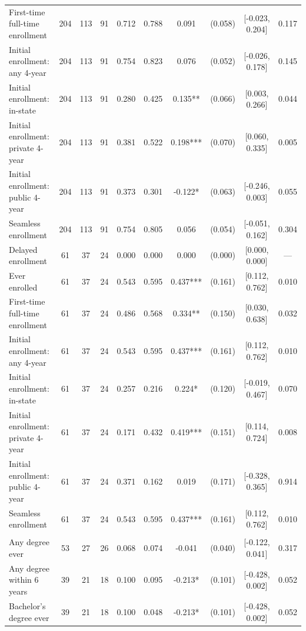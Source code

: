 \begin{table}[t]
\begin{tabular*}{\linewidth}{@{\extracolsep{\fill}}l|ccccccccc}
First-time full-time enrollment & 204 & 113 & 91 & 0.712 & 0.788 & 0.091 & (0.058) & [-0.023, 0.204] & 0.117 \\ 
Initial enrollment: any 4-year & 204 & 113 & 91 & 0.754 & 0.823 & 0.076 & (0.052) & [-0.026, 0.178] & 0.145 \\ 
Initial enrollment: in-state & 204 & 113 & 91 & 0.280 & 0.425 & 0.135** & (0.066) & [0.003, 0.266] & 0.044 \\ 
Initial enrollment: private 4-year & 204 & 113 & 91 & 0.381 & 0.522 & 0.198*** & (0.070) & [0.060, 0.335] & 0.005 \\ 
Initial enrollment: public 4-year & 204 & 113 & 91 & 0.373 & 0.301 & -0.122* & (0.063) & [-0.246, 0.003] & 0.055 \\ 
Seamless enrollment & 204 & 113 & 91 & 0.754 & 0.805 & 0.056 & (0.054) & [-0.051, 0.162] & 0.304 \\ 
Delayed enrollment & 61 & 37 & 24 & 0.000 & 0.000 & 0.000 & (0.000) & [0.000, 0.000] & — \\ 
Ever enrolled & 61 & 37 & 24 & 0.543 & 0.595 & 0.437*** & (0.161) & [0.112, 0.762] & 0.010 \\ 
First-time full-time enrollment & 61 & 37 & 24 & 0.486 & 0.568 & 0.334** & (0.150) & [0.030, 0.638] & 0.032 \\ 
Initial enrollment: any 4-year & 61 & 37 & 24 & 0.543 & 0.595 & 0.437*** & (0.161) & [0.112, 0.762] & 0.010 \\ 
Initial enrollment: in-state & 61 & 37 & 24 & 0.257 & 0.216 & 0.224* & (0.120) & [-0.019, 0.467] & 0.070 \\ 
Initial enrollment: private 4-year & 61 & 37 & 24 & 0.171 & 0.432 & 0.419*** & (0.151) & [0.114, 0.724] & 0.008 \\ 
Initial enrollment: public 4-year & 61 & 37 & 24 & 0.371 & 0.162 & 0.019 & (0.171) & [-0.328, 0.365] & 0.914 \\ 
Seamless enrollment & 61 & 37 & 24 & 0.543 & 0.595 & 0.437*** & (0.161) & [0.112, 0.762] & 0.010 \\ 
\midrule\addlinespace[2.5pt]
\multicolumn{10}{l}{{\itshape \textbf{Panel C: Degree and Persistence Outcomes} \emph{(non-censored subsample)}}} \\[2.5pt] 
\midrule\addlinespace[2.5pt]
Any degree ever & 53 & 27 & 26 & 0.068 & 0.074 & -0.041 & (0.040) & [-0.122, 0.041] & 0.317 \\ 
Any degree within 6 years & 39 & 21 & 18 & 0.100 & 0.095 & -0.213* & (0.101) & [-0.428, 0.002] & 0.052 \\ 
Bachelor's degree ever & 39 & 21 & 18 & 0.100 & 0.048 & -0.213* & (0.101) & [-0.428, 0.002] & 0.052 \\ 

\end{tabular*}
\end{table}
